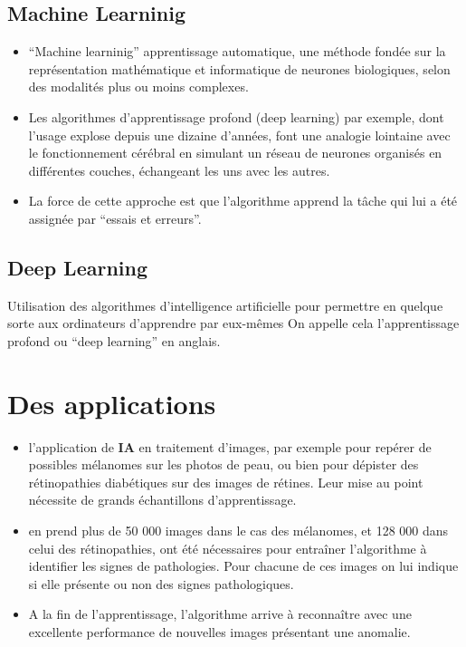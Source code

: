 \subsection{Machine Learninig}
\begin{itemize}
    \item
    ``Machine learninig'' apprentissage automatique, une méthode fondée sur
    la représentation mathématique et informatique de neurones
    biologiques, selon des modalités plus ou moins complexes.

    \item
    Les algorithmes d'apprentissage profond (deep learning) par exemple, dont
    l'usage explose depuis une dizaine d'années, font une analogie
    lointaine avec le fonctionnement cérébral en simulant un réseau de
    neurones organisés en différentes couches, échangeant les uns avec les
    autres.

    \item
    La force de cette approche est que l'algorithme apprend la
    tâche qui lui a été assignée par ``essais et erreurs''.
\end{itemize}
\subsection{Deep Learning}
    Utilisation des algorithmes d'intelligence artificielle pour permettre
    en quelque sorte aux ordinateurs d'apprendre par eux-mêmes On
    appelle cela l'apprentissage profond ou ``deep learning'' en anglais.

\section{Des applications}
\begin{itemize}
    \item
        l'application de \textbf{IA} en traitement d'images, par exemple pour repérer de
        possibles mélanomes sur les photos de peau, ou bien pour dépister des
        rétinopathies diabétiques sur des images de rétines. Leur mise au point
        nécessite de grands échantillons d'apprentissage.
    \item
        en prend plus de 50 000 images dans le cas des mélanomes, et 128 000
        dans celui des rétinopathies, ont été nécessaires pour entraîner
        l'algorithme à identifier les signes de pathologies. Pour chacune
        de ces images on lui indique si elle présente ou non des signes
        pathologiques.
    \item
        A la fin de l'apprentissage, l'algorithme arrive à
        reconnaître avec une excellente performance de nouvelles images
        présentant une anomalie.
\end{itemize}

